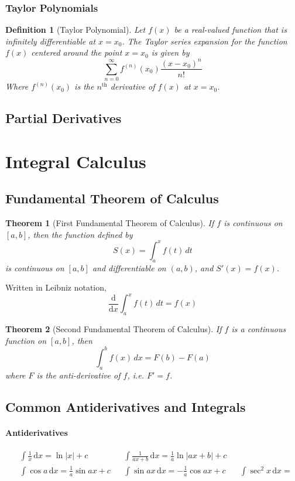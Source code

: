 \documentclass[12pt]{article}
\newcommand{\diff}[1]{\frac{\mathrm{d}}{\mathrm{d}#1}}
\newcommand{\der}[1]{\, \mathrm{d}#1}
\newtheorem{thrm}{Theorem}
\newtheorem{defn}{Definition}
\begin{document}
\subsubsection{Taylor Polynomials}
\begin{defn}[Taylor Polynomial]
\label{taylorpoly}
Let $f(x)$ be a real-valued function that is infinitely differentiable at $x = x_0$. The Taylor series expansion for the function $f(x)$ centered around the point $x = x_0$ is given by
$$\sum_{n=0}^{\infty}f^{(n)}(x_0)\frac{(x - x_0)^{n}}{n!}$$
Where $f^{(n)}(x_0)$ is the $n^\text{th}$ derivative of $f(x)$ at $x = x_0$.
\end{defn}
\subsection{Partial Derivatives}
\section{Integral Calculus}
\subsection{Fundamental Theorem of Calculus}
\begin{thrm}[First Fundamental Theorem of Calculus]
	\label{ftc}
	If $f$ is continuous on $[a,b]$, then the function defined by
	$$S(x)=\int _{ a }^{ x }{ f(t)\, dt }$$
	is continuous on $[a,b]$ and differentiable on $(a,b)$, and $S'(x)=f(x)$.
\end{thrm}
Written in Leibniz notation,
$$\diff{x}\int_{a}^{x} f(t)\, dt = f(x)$$

\begin{thrm}[Second Fundamental Theorem of Calculus]
	If $f$ is a continuous function on $[a,b]$, then	
	$$\int _{ a }^{ b }{ f(x)\, dx=F(b)-F(a)}$$
	where $F$ is the anti-derivative of $f$, i.e. $F'=f$.
\end{thrm}
\subsection{Common Antiderivatives and Integrals}
\paragraph{Antiderivatives}
\begin{align*}
&\int\frac{1}{x}\der{x} = \ln|x| + c & &\int{\frac{1}{ax + b}\der{x}} = \frac{1}{a}\ln|ax+b| + c \\
&\int \cos a \der{x}= \frac1a \sin ax + c & &\int \sin ax\der{x}= - \frac1a \cos ax + c  &  &\int \sec^2x \der{x} = 
\end{align*}
\end{document}
